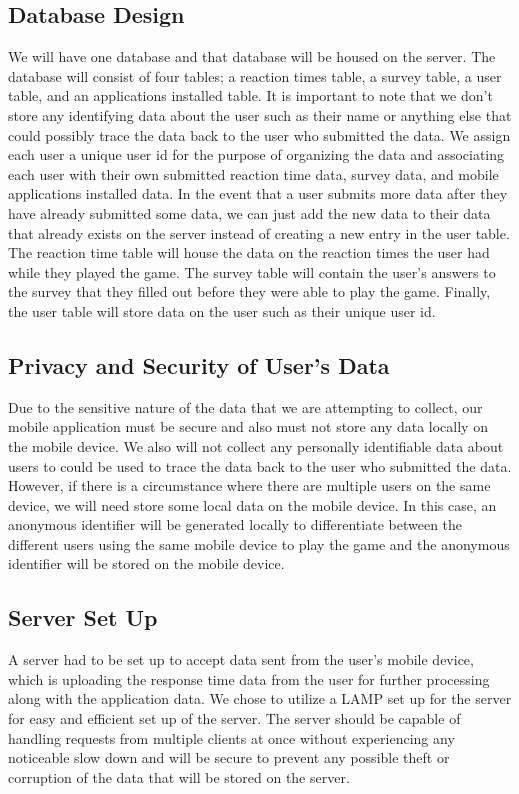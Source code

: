 \documentclass[a4wide]{article}
\begin{document}
\subsection{Database Design}
\- We will have one database and that database will be housed on the server. The database will consist of four tables; a reaction times table, a survey table, a user table, and an applications installed table. It is important to note that we don't store any identifying data about the user such as their name or anything else that could possibly trace the data back to the user who submitted the data. We assign each user a unique user id for the purpose of organizing the data and associating each user with their own submitted reaction time data, survey data, and mobile applications installed data. In the event that a user submits more data after they have already submitted some data, we can just add the new data to their data that already exists on the server instead of creating a new entry in the user table. The reaction time table will house the data on the reaction times the user had while they played the game. The survey table will contain the user's answers to the survey that they filled out before they were able to play the game. Finally, the user table will store data on the user such as their unique user id. 

\subsection{Privacy and Security of User's Data}
\- Due to the sensitive nature of the data that we are attempting to collect, our mobile application must be secure and also must not store any data locally on the mobile device. We also will not collect any personally identifiable data about users to could be used to trace the data back to the user who submitted the data. However, if there is a circumstance where there are multiple users on the same device, we will need store some local data on the mobile device. In this case, an anonymous identifier will be generated locally to differentiate between the different users using the same mobile device to play the game and the anonymous identifier will be stored on the mobile device. 

\subsection{Server Set Up}
\- A server had to be set up to accept data sent from the user's mobile device, which is uploading the response time data from the user for further processing along with the application data. We chose to utilize a LAMP set up for the server for easy and efficient set up of the server. The server should be capable of handling requests from multiple clients at once without experiencing any noticeable slow down and will be secure to prevent any possible theft or corruption of the data that will be stored on the server.
\end{document}
